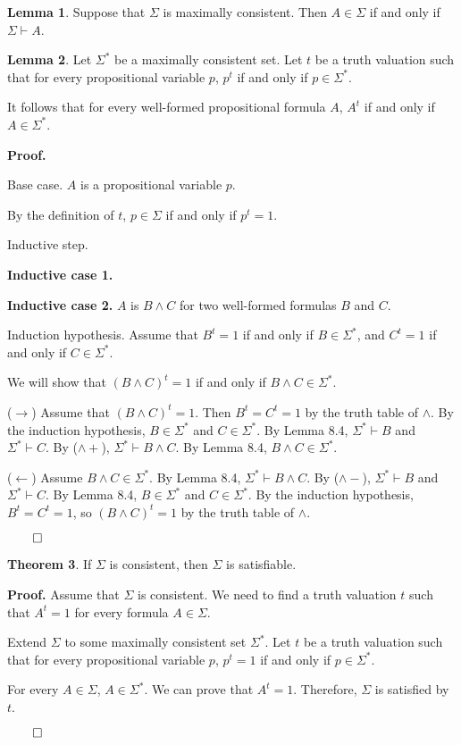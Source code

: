 \documentclass[11pt]{article}
\theoremstyle{definition}
\newtheorem{thm}{Theorem}[section]
\newtheorem{lemma}[thm]{Lemma}
\begin{document}
\begin{lemma}
Suppose that $\Sigma$ is maximally consistent. Then $A \in \Sigma$ if and only if $\Sigma \vdash A$.
\end{lemma}

\begin{lemma}
Let $\Sigma^*$ be a maximally consistent set. Let $t$ be a truth valuation such that for every propositional variable $p$, $p^t$ if and only if $p \in \Sigma^*$. 

It follows that for every well-formed propositional formula $A$, $A^t$ if and only if $A \in \Sigma^*$.

{\bf Proof.} 

{\sc Base case.} $A$ is a propositional variable $p$.

By the definition of $t$, $p \in \Sigma$ if and only if $p^t = 1$.

{\sc Inductive step.}

{\bf Inductive case 1.}

{\bf Inductive case 2.} $A$ is $B \wedge C$ for two well-formed formulas $B$ and $C$.

{\small Induction hypothesis.} Assume that $B^t = 1$ if and only if $B \in \Sigma^*$, and $C^t = 1$ if and only if $C \in \Sigma^*$. 

We will show that $(B \wedge C)^t = 1$ if and only if $B \wedge C \in \Sigma^*$.

($\rightarrow$) Assume that $(B \wedge C)^t = 1$. Then $B^t = C^t = 1$ by the truth table of $\wedge$. By the induction hypothesis, $B \in \Sigma^*$ and $C \in \Sigma^*$. By Lemma 8.4, $\Sigma^* \vdash B$ and $\Sigma^* \vdash C$. By ($\wedge+$), $\Sigma^* \vdash B \wedge C$. By Lemma 8.4, $B \wedge C \in \Sigma^*$. 

($\leftarrow$) Assume $B \wedge C \in \Sigma^*$. By Lemma 8.4, $\Sigma^* \vdash B \wedge C$. By ($\wedge-$), $\Sigma^* \vdash B$ and $\Sigma^* \vdash C$. By Lemma 8.4, $B \in \Sigma^*$ and $C \in \Sigma^*$. By the induction hypothesis, $B^t = C^t = 1$, so $(B \wedge C)^t = 1$ by the truth table of $\wedge$.
\vspace{-1cm} \begin{flushright} $\qed$ \end{flushright}
\end{lemma}

\begin{thm}
If $\Sigma$ is consistent, then $\Sigma$ is satisfiable.

{\bf Proof.} Assume that $\Sigma$ is consistent. We need to find a truth valuation $t$ such that $A^t = 1$ for every formula $A \in \Sigma$. 

Extend $\Sigma$ to some maximally consistent set $\Sigma^*$. Let $t$ be a truth valuation such that for every propositional variable $p$, $p^t = 1$ if and only if $p \in \Sigma^*$. 

For every $A \in \Sigma$, $A \in \Sigma^*$. We can prove that $A^t = 1$. Therefore, $\Sigma$ is satisfied by $t$.
\vspace{-1cm} \begin{flushright} $\qed$ \end{flushright}
\end{thm}
\end{document}
